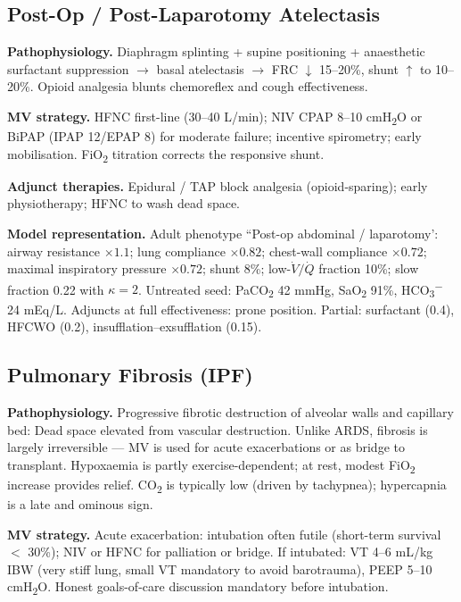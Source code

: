 \subsection{Post-Op / Post-Laparotomy Atelectasis}
\textbf{Pathophysiology.} Diaphragm splinting + supine positioning + anaesthetic surfactant suppression $\to$ basal atelectasis $\to$ FRC $\downarrow$ 15--20\%, shunt $\uparrow$ to 10--20\%. Opioid analgesia blunts chemoreflex and cough effectiveness.

\textbf{MV strategy.} HFNC first-line (30--40 L/min); NIV CPAP 8--10 cmH\textsubscript{2}O or BiPAP (IPAP 12/EPAP 8) for moderate failure; incentive spirometry; early mobilisation. FiO\textsubscript{2} titration corrects the responsive shunt.

\textbf{Adjunct therapies.} Epidural / TAP block analgesia (opioid-sparing); early physiotherapy; HFNC to wash dead space.

\textbf{Model representation.} Adult phenotype ``Post-op abdominal / laparotomy': airway resistance $\times1.1$; lung compliance $\times0.82$; chest-wall compliance $\times0.72$; maximal inspiratory pressure $\times0.72$; shunt 8\%; low-$\dot V/\dot Q$ fraction 10\%; slow fraction 0.22 with $\kappa=2$. Untreated seed: PaCO\textsubscript{2} 42 mmHg, SaO\textsubscript{2} 91\%, HCO\textsubscript{3}\textsuperscript{$-$} 24 mEq/L. Adjuncts at full effectiveness: prone position. Partial: surfactant (0.4), HFCWO (0.2), insufflation--exsufflation (0.15).

\subsection{Pulmonary Fibrosis (IPF)}
\textbf{Pathophysiology.} Progressive fibrotic destruction of alveolar walls and capillary bed: Dead space elevated from vascular destruction. Unlike ARDS, fibrosis is largely irreversible --- MV is used for acute exacerbations or as bridge to transplant. Hypoxaemia is partly exercise-dependent; at rest, modest FiO\textsubscript{2} increase provides relief. CO\textsubscript{2} is typically low (driven by tachypnea); hypercapnia is a late and ominous sign.

\textbf{MV strategy.} Acute exacerbation: intubation often futile (short-term survival $<$ 30\%); NIV or HFNC for palliation or bridge. If intubated: VT 4--6 mL/kg IBW (very stiff lung, small VT mandatory to avoid barotrauma), PEEP 5--10 cmH\textsubscript{2}O. Honest goals-of-care discussion mandatory before intubation.

